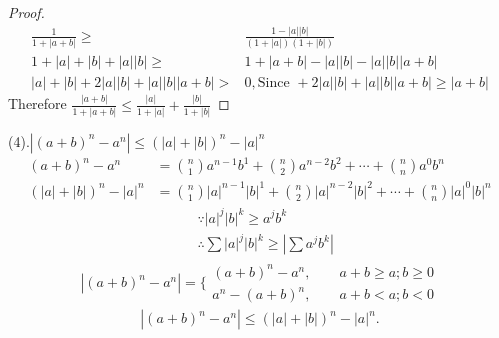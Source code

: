 \begin{example}
\begin{proof}
\begin{align*}
		\frac{1}{1+|a+b|}\ge &\frac{1-|a||b|}{(1+|a|)(1+|b|)}\\
		1+|a|+|b|+|a||b| \ge & 1+|a+b|-|a||b|-|a||b||a+b|\\
		|a|+|b|+2|a||b|+|a||b||a+b|>&0, \text{Since }+2|a||b|+|a||b||a+b|\ge|a+b|
	\end{align*}
	Therefore $\frac{|a+b|}{1+|a+b|}\leqslant \frac{|a|}{1+|a|} + \frac{|b|}{1+|b|} $
	\end{proof}
\end{example}

\begin{example}
	(4).$ |(a+b)^n-a^n| \leqslant (|a|+|b|)^n-|a|^n $
	\begin{align*}
		(a+b)^n-a^n &= \binom{n}{1}a^{n-1}b^{1} + \binom{n}{2}a^{n-2}b^{2} + \cdots + \binom{n}{n}a^{0}b^{n}\\
		(|a|+|b|)^n-|a|^n &= \binom{n}{1}|a|^{n-1}|b|^{1} + \binom{n}{2}|a|^{n-2}|b|^{2} + \cdots + \binom{n}{n}|a|^{0}|b|^{n}
	\end{align*}
	\begin{align*}
		&\because |a|^j|b|^k \ge a^j b^k\\
		&\therefore \sum |a|^j|b|^k \ge |\sum a^j b^k|
	\end{align*}
\begin{align*}
	|(a+b)^n-a^n| = \Big\lbrace 
	\begin{aligned}
		(a+b)^n-a^n,\qquad a+b\ge a; b\ge0\\
		a^n-(a+b)^n,\qquad a+b< a; b<0
	\end{aligned}
\end{align*}
\begin{equation}\label{keyEx134answer}
	|(a+b)^n-a^n| \leqslant (|a|+|b|)^n - |a|^n.
\end{equation}
\end{example}

